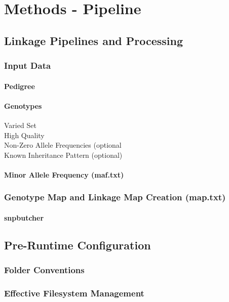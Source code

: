 \chapter{Methods - Pipeline}

\section{Linkage Pipelines and Processing}

\subsection{Input Data}
\subsubsection{Pedigree}
\subsubsection{Genotypes}
\begin{description}
\item[Varied Set]{}
\item[High Quality]{}
\item[Non-Zero Allele Frequencies (optional]{}
\item[Known Inheritance Pattern (optional)]{}
\end{description}
\subsubsection{Minor Allele Frequency (maf.txt)}

\subsection{Genotype Map and Linkage Map Creation (map.txt)}
\subsubsection{snpbutcher}


\section{Pre-Runtime Configuration}
\subsection{Folder Conventions}
\subsection{Effective Filesystem Management}
